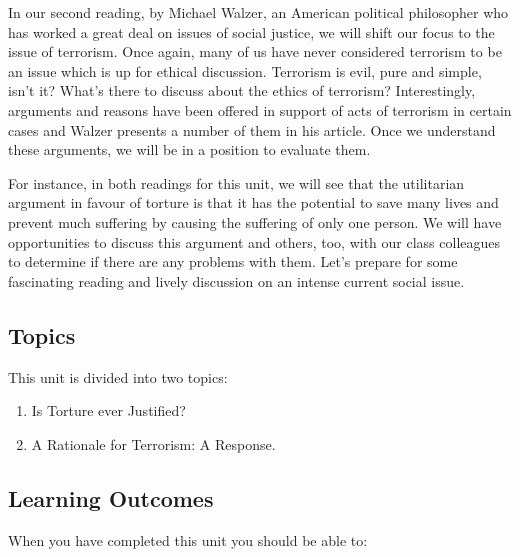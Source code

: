 \documentclass[
]{book}
\providecommand{\tightlist}{%
  \setlength{\itemsep}{0pt}\setlength{\parskip}{0pt}}
\begin{document}
In our second reading, by Michael Walzer, an American political philosopher who has worked a great deal on issues of social justice, we will shift our focus to the issue of terrorism. Once again, many of us have never considered terrorism to be an issue which is up for ethical discussion. Terrorism is evil, pure and simple, isn't it? What's there to discuss about the ethics of terrorism? Interestingly, arguments and reasons have been offered in support of acts of terrorism in certain cases and Walzer presents a number of them in his article. Once we understand these arguments, we will be in a position to evaluate them.

For instance, in both readings for this unit, we will see that the utilitarian argument in favour of torture is that it has the potential to save many lives and prevent much suffering by causing the suffering of only one person. We will have opportunities to discuss this argument and others, too, with our class colleagues to determine if there are any problems with them.
Let's prepare for some fascinating reading and lively discussion on an intense current social issue.

\hypertarget{topics-8}{%
\subsection*{Topics}\label{topics-8}}

This unit is divided into two topics:

\begin{enumerate}
\def\labelenumi{\arabic{enumi}.}
\tightlist
\item
  Is Torture ever Justified? ~
\item
  A Rationale for Terrorism: A Response. ~
\end{enumerate}

\hypertarget{learning-outcomes-8}{%
\subsection*{Learning Outcomes}\label{learning-outcomes-8}}

When you have completed this unit you should be able to:
\end{document}
